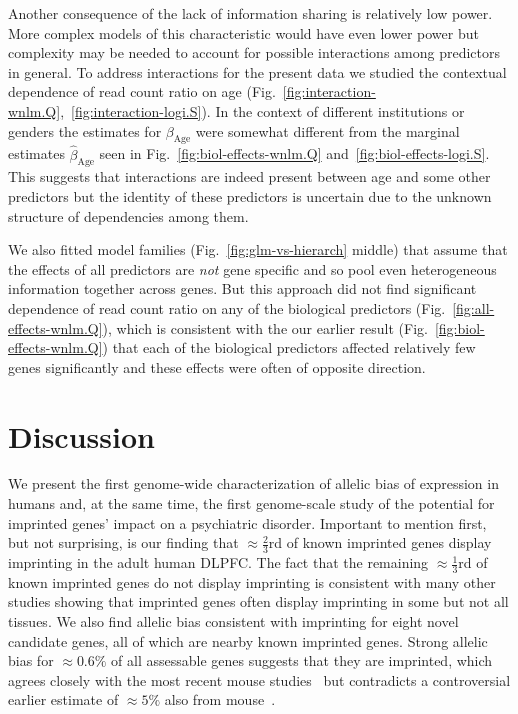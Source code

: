 \documentclass[12pt,letterpaper]{article}
\begin{document}
Another consequence of the lack of information sharing is relatively low
power.  More complex models of this characteristic would have even lower power
but complexity may be needed to account for possible interactions among predictors in
general.  To address interactions for the present data we studied the contextual
dependence of read count ratio on age
(Fig.~\ref{fig:interaction-wnlm.Q},~\ref{fig:interaction-logi.S}).  In the
context of different institutions or genders the estimates for
\(\beta_\mathrm{Age}\) were somewhat different from the marginal estimates
\(\hat\beta_\mathrm{Age}\) seen in Fig.~\ref{fig:biol-effects-wnlm.Q}
and~\ref{fig:biol-effects-logi.S}.  This suggests that interactions are indeed
present between age and some other predictors but the identity of these
predictors is uncertain due to the unknown structure of dependencies among them.

We also fitted model families (Fig.~\ref{fig:glm-vs-hierarch} middle) that
assume that the effects of all predictors are \emph{not} gene specific and so
pool even heterogeneous information together across genes.  But this approach
did not find significant dependence of read count ratio on any of the
biological predictors (Fig.~\ref{fig:all-effects-wnlm.Q}), which is consistent
with the our earlier result (Fig.~\ref{fig:biol-effects-wnlm.Q}) that each of
the biological predictors affected relatively few genes significantly and these
effects were often of opposite direction.

\section{Discussion}

We present the first genome-wide characterization of allelic bias of
expression in humans and, at the same time, the first genome-scale study of
the potential for imprinted genes' impact on a psychiatric disorder. Important
to mention first, but not surprising, is our finding that \(\approx
\frac{2}{3}\)rd of known imprinted genes display imprinting in the adult human
DLPFC. The fact that the remaining \(\approx \frac{1}{3}\)rd of known
imprinted genes do not display imprinting is consistent with many other
studies showing that imprinted genes often display imprinting in some but not
all tissues. We also find allelic bias consistent with imprinting for eight
novel candidate genes, all of which are nearby known imprinted genes.  Strong
allelic bias for \(\approx 0.6\%\) of all assessable genes suggests that they
are imprinted, which agrees closely with the most recent mouse
studies~\cite{DeVeale2012,Perez2015} but contradicts a controversial earlier
estimate of \(\approx 5\%\) also from mouse~\cite{Gregg2010a}.
\end{document}
